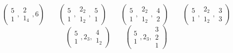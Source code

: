 \[
\left(\begin{smallmatrix}5\\1\end{smallmatrix},\begin{smallmatrix}2\\1_4\end{smallmatrix},6\right)\qquad \left(\begin{smallmatrix}5\\1\end{smallmatrix},\begin{smallmatrix}2_2\\1_2\end{smallmatrix},\begin{smallmatrix}5\\1\end{smallmatrix}\right)\qquad \left(\begin{smallmatrix}5\\1\end{smallmatrix},\begin{smallmatrix}2_2\\1_2\end{smallmatrix},\begin{smallmatrix}4\\2\end{smallmatrix}\right)\qquad \left(\begin{smallmatrix}5\\1\end{smallmatrix},\begin{smallmatrix}2_2\\1_2\end{smallmatrix},\begin{smallmatrix}3\\3\end{smallmatrix}\right)
\]
\[
\left(\begin{smallmatrix}5\\1\end{smallmatrix},2_3,\begin{smallmatrix}4\\1_2\end{smallmatrix}\right)\qquad \left(\begin{smallmatrix}5\\1\end{smallmatrix},2_3,\begin{smallmatrix}3\\2\\1\end{smallmatrix}\right)
\]

